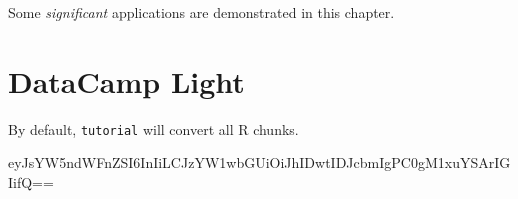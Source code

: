 \documentclass[
]{book}
\theoremstyle{definition}
\theoremstyle{definition}
\theoremstyle{definition}
\theoremstyle{definition}
\theoremstyle{remark}
\begin{document}
Some \emph{significant} applications are demonstrated in this chapter.

\hypertarget{datacamp-light}{%
\section{DataCamp Light}\label{datacamp-light}}

By default, \texttt{tutorial} will convert all R chunks.

eyJsYW5ndWFnZSI6InIiLCJzYW1wbGUiOiJhIDwtIDJcbmIgPC0gM1xuYSArIGIifQ==

  
\end{document}
